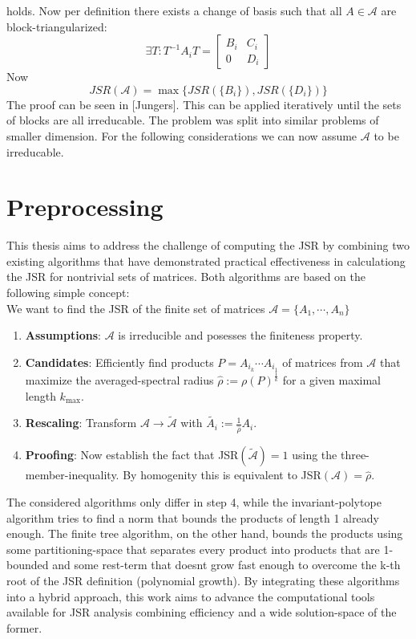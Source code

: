 holds. Now per definition there exists a change of basis such that all $A \in \mathcal{A}$ are block-triangularized: 
$$\exists T: T^{-1}A_{i}T = 
\begin{bmatrix}
B_i & C_i  \\
0 & D_i
\end{bmatrix}
$$
Now 
\begin{equation}
    JSR(\mathcal{A}) = \max\{JSR(\{B_i\}), JSR(\{D_i\})\}
\end{equation}
The proof can be seen in [Jungers].
This can be applied iteratively until the sets of blocks are all irreducable.
The problem was split into similar problems of smaller dimension.
For the following considerations we can now assume $\mathcal{A}$ to be irreducable.

\section{Preprocessing}
This thesis aims to address the challenge of computing the JSR by combining two existing algorithms that have demonstrated practical effectiveness in calculationg the JSR for nontrivial sets of matrices. Both algorithms are based on the following simple concept: \\

We want to find the JSR of the finite set of matrices $\mathcal{A} = \{A_1, \cdots, A_n\}$
\begin{enumerate}
    \item \textbf{Assumptions}: $\mathcal{A}$ is irreducible and posesses the finiteness property. 
    \item \textbf{Candidates}: Efficiently find products $P = A_{i_k} \cdots A_{i_1}$ of matrices from $\mathcal{A}$ that maximize the averaged-spectral radius $\hat{\rho} := \rho(P)^\frac{1}{k}$ for a given maximal length $k_{\text{max}}$.
    \item \textbf{Rescaling}: Transform $\mathcal{A} \to \tilde{\mathcal{A}}$ with $\tilde{A_i} := \frac{1}{\hat{\rho}} A_i$.
    \item \textbf{Proofing}: Now establish the fact that JSR$(\tilde{\mathcal{A}}) = 1$ using the three-member-inequality. By homogenity this is equivalent to JSR$(\mathcal{A}) = \hat{\rho}$.
\end{enumerate}

The considered algorithms only differ in step 4, while the invariant-polytope algorithm tries to find a norm that bounds the products of length 1 already enough. The finite tree algorithm, on the other hand, bounds the products using some partitioning-space that separates every product into products that are 1-bounded and some rest-term that doesnt grow fast enough to overcome the k-th root of the JSR definition (polynomial growth).
By integrating these algorithms into a hybrid approach, this work aims to advance the computational tools available for JSR analysis combining efficiency and a wide solution-space of the former.
